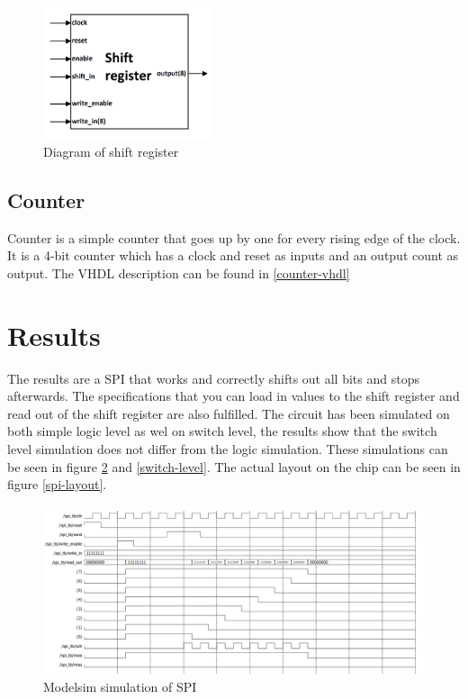 \documentclass[11pt,twoside,a4paper]{article}
\begin{document}
\begin{figure}[H]
\center
\includegraphics[width=5cm]{./shift_register_diagram}
\caption{Diagram of shift register}
\label{shift-register}
\end{figure}

\subsection{Counter}
Counter is a simple counter that goes up by one for every rising edge of the clock. It is a 4-bit counter which has a clock and reset as inputs and an output count as output. The VHDL description can be found in \ref{counter-vhdl}

\section{Results}
The results are a SPI that works and correctly shifts out all bits and stops afterwards. The specifications that you can load in values to the shift register and read out of the shift register are also fulfilled. The circuit has been simulated on both simple logic level as wel on switch level, the results show that the switch level simulation does not differ from the logic simulation. These simulations can be seen in figure \ref{spi-modelsim} and \ref{switch-level}. The actual layout on the chip can be seen in figure \ref{spi-layout}.

\begin{figure}[H]
\center
\includegraphics[width=16cm]{./modelsim_sim}
\caption{Modelsim simulation of SPI}
\label{spi-modelsim}
\end{figure}
\end{document}

